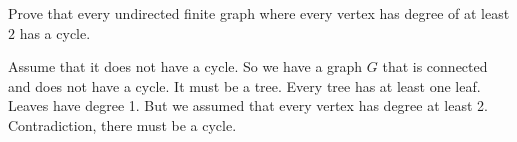 \question Prove that every undirected finite graph where every vertex 
has degree of at least $2$ has a cycle.

\begin{solution}[3 in]
Assume that it does not have a cycle.
So we have a graph $G$ that is connected and does not have a cycle. 
It must be a tree.
Every tree has at least one leaf. Leaves have degree 1. But we assumed 
that every vertex has degree at least 2. Contradiction, there must be 
a cycle.
\end{solution}